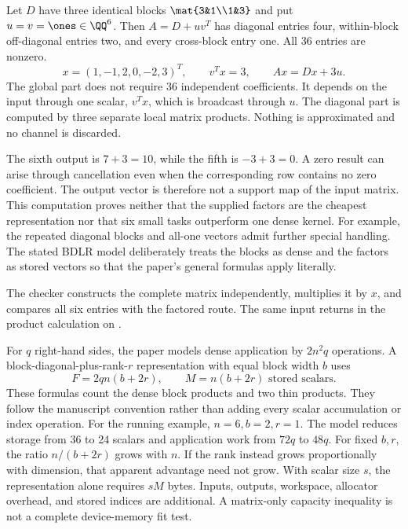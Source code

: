 Let $D$ have three identical blocks $\mat{3&1\\1&3}$ and put $u=v=\ones\in\QQ^6$. Then $A=D+uv^T$ has diagonal entries four, within-block off-diagonal entries two, and every cross-block entry one. All 36 entries are nonzero.
\[
x=(1,-1,2,0,-2,3)^T,\qquad v^Tx=3,\qquad Ax=Dx+3u.
\]
The global part does not require 36 independent coefficients. It depends on the input through one scalar, $v^Tx$, which is broadcast through $u$. The diagonal part is computed by three separate local matrix products. Nothing is approximated and no channel is discarded.

The sixth output is $7+3=10$, while the fifth is $-3+3=0$. A zero result can arise through cancellation even when the corresponding row contains no zero coefficient. The output vector is therefore not a support map of the input matrix.
This computation proves neither that the supplied factors are the cheapest representation nor that six small tasks outperform one dense kernel. For example, the repeated diagonal blocks and all-one vectors admit further special handling. The stated BDLR model deliberately treats the blocks as dense and the factors as stored vectors so that the paper's general formulas apply literally.

The checker constructs the complete matrix independently, multiplies it by $x$, and compares all six entries with the factored route. The same input returns in the product calculation on .

For $q$ right-hand sides, the paper models dense application by $2n^2q$ operations. A block-diagonal-plus-rank-$r$ representation with equal block width $b$ uses
\[
F=2qn(b+2r),\qquad M=n(b+2r)\text{ stored scalars}.
\]
These formulas count the dense block products and two thin products. They follow the manuscript convention rather than adding every scalar accumulation or index operation.
For the running example, $n=6,b=2,r=1$. The model reduces storage from 36 to 24 scalars and application work from $72q$ to $48q$. For fixed $b,r$, the ratio $n/(b+2r)$ grows with $n$. If the rank instead grows proportionally with dimension, that apparent advantage need not grow.
With scalar size $s$, the representation alone requires $sM$ bytes. Inputs, outputs, workspace, allocator overhead, and stored indices are additional. A matrix-only capacity inequality is not a complete device-memory fit test.

